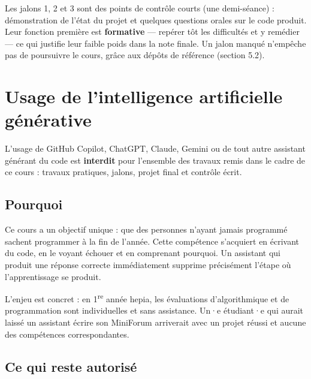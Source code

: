 \documentclass[a4paper,11pt]{article}
\begin{document}
\begin{tcolorbox}[jalon, title={Nature des jalons}]
\small
Les jalons 1, 2 et 3 sont des points de contrôle courts (une demi-séance) : démonstration de l'état du projet et quelques questions orales sur le code produit. Leur fonction première est \textbf{formative} — repérer tôt les difficultés et y remédier — ce qui justifie leur faible poids dans la note finale. Un jalon manqué n'empêche pas de poursuivre le cours, grâce aux dépôts de référence (section 5.2).
\end{tcolorbox}

\section{Usage de l'intelligence artificielle générative}

\begin{tcolorbox}[alerte, title={Les assistants de génération de code sont interdits dans ce cours}]
\small
L'usage de GitHub Copilot, ChatGPT, Claude, Gemini ou de tout autre assistant générant du code est \textbf{interdit} pour l'ensemble des travaux remis dans le cadre de ce cours : travaux pratiques, jalons, projet final et contrôle écrit.
\end{tcolorbox}

\subsection{Pourquoi}

Ce cours a un objectif unique : que des personnes n'ayant jamais programmé sachent programmer à la fin de l'année. Cette compétence s'acquiert en écrivant du code, en le voyant échouer et en comprenant pourquoi. Un assistant qui produit une réponse correcte immédiatement supprime précisément l'étape où l'apprentissage se produit.

L'enjeu est concret : en 1\textsuperscript{re} année hepia, les évaluations d'algorithmique et de programmation sont individuelles et sans assistance. Un·e étudiant·e qui aurait laissé un assistant écrire son MiniForum arriverait avec un projet réussi et aucune des compétences correspondantes.

\subsection{Ce qui reste autorisé}
\end{document}
